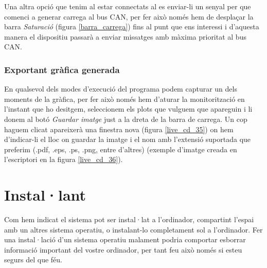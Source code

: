 
Una altra opció que tenim al estar connectats al \Monitor es enviar-li un senyal per que comenci a generar carrega al bus CAN, per fer això només hem de desplaçar la barra \emph{Saturació} (figura \ref{barra_carrega}) fins al punt que ens interessi i d'aquesta manera el dispositiu \Monitor passarà a enviar missatges amb màxima prioritat al bus CAN.


\clearpage

\subsubsection{Exportant gràfica generada}\label{cap:gui:cd:dcsmonitor:image}

En qualsevol dels modes d'execució del programa podem capturar un dels moments de la gràfica, per fer això només hem d'aturar la monitorització en l'instant que ho desitgem, seleccionem els plots que vulguem que apareguin i li donem al botó \emph{Guardar imatge} just a la dreta de la barra de carrega. Un cop haguem clicat apareixerà una finestra nova (figura \ref{live_cd_35}) on hem d'indicar-li el lloc on guardar la imatge i el nom amb l'extensió suportada que preferim (.pdf, .eps, .ps, .png, entre d'altres) (exemple d'imatge creada en l'escriptori en la figura \ref{live_cd_36}).



\section{Instal·lant}\label{cap:gui:cd:inst}

Com hem indicat el sistema pot ser instal·lat a l'ordinador, compartint l'espai amb un altres sistema operatiu, o instalant-lo completament sol a l'ordinador. Fer una instal·lació d'un sistema operatiu malament podria comportar esborrar informació important del vostre ordinador, per tant feu això només si esteu segurs del que féu.

